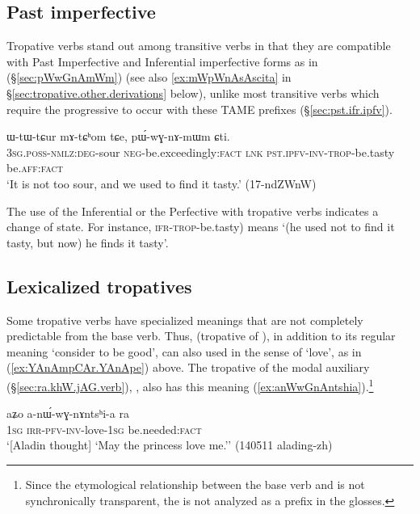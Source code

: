 \subsection{Past imperfective} \label{sec:tropative.pst.ipfv}
 
Tropative verbs stand out among transitive verbs in that they are compatible with Past Imperfective  and Inferential imperfective  forms as in (§\ref{sec:pWwGnAmWm}) (see also \ref{ex:mWpWnAsAscita} in §\ref{sec:tropative.other.derivations} below), unlike most transitive verbs which require the progressive  to occur with these TAME prefixes (§\ref{sec:pst.ifr.ipfv}).


 \begin{exe}
\ex \label{sec:pWwGnAmWm}
\gll ɯ-tɯ-tɕur mɤ-tɕʰom tɕe, pɯ́-wɣ-nɤ-mɯm ɕti.  \\
\textsc{3sg}.\textsc{poss}-\textsc{nmlz}:\textsc{deg}-sour \textsc{neg}-be.exceedingly:\textsc{fact} \textsc{lnk} \textsc{pst}.\textsc{ipfv}-\textsc{inv}-\textsc{trop}-be.tasty be.\textsc{aff}:\textsc{fact} \\
 \glt `It is not too sour, and we used to find it tasty.' (17-ndZWnW)
\end{exe}  

The use of the Inferential or the Perfective with tropative verbs indicates a change of state. For instance,  \textsc{ifr}-\textsc{trop}-be.tasty) means `(he used not to find it tasty, but now) he finds it tasty'.
 
\subsection{Lexicalized tropatives} \label{sec:tropative.lexicalized}
Some tropative verbs have specialized meanings that are not completely predictable from the base verb. Thus,  (tropative of ), in addition to its regular meaning `consider to be good', can also used in the sense of `love', as in (\ref{ex:YAnAmpCAr.YAnApe}) above. The tropative of the modal auxiliary  (§\ref{sec:ra.khW.jAG.verb}), , also has this meaning (\ref{ex:anWwGnAntshia}).\footnote{Since the etymological relationship between the base verb   and  is not synchronically transparent, the  is not analyzed as a prefix in the glosses. }

\begin{exe}
\ex \label{ex:anWwGnAntshia}
\gll aʑo a-nɯ́-wɣ-nɤntsʰi-a ra \\
\textsc{1sg} \textsc{irr}-\textsc{pfv}-\textsc{inv}-love-\textsc{1sg} be.needed:\textsc{fact} \\
\glt `[Aladin thought] `May the princess love me.'' (140511 alading-zh)
\end{exe}

